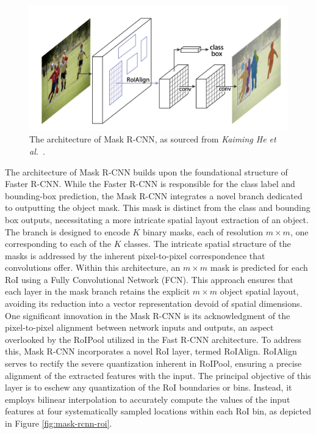 \begin{figure}[htb]
    \centering
    \includegraphics[width=0.7\linewidth]{figures/chapters-imgs/30/mask-rcnn-arq.png}
    \caption{The architecture of Mask R-CNN, as sourced from \textit{Kaiming He et al.}~\cite{DBLP:journals/corr/HeGDG17}.}
    \label{fig:mask-rcnn-arq}
\end{figure}

The architecture of Mask R-CNN builds upon the foundational structure of Faster R-CNN. While the Faster R-CNN is responsible for the class label and bounding-box prediction, the Mask R-CNN integrates a novel branch dedicated to outputting the object mask. This mask is distinct from the class and bounding box outputs, necessitating a more intricate spatial layout extraction of an object. The branch is designed to encode \(K\) binary masks, each of resolution \(m \times m\), one corresponding to each of the \(K\) classes. The intricate spatial structure of the masks is addressed by the inherent pixel-to-pixel correspondence that convolutions offer. Within this architecture, an \(m \times m\) mask is predicted for each RoI using a Fully Convolutional Network (FCN). This approach ensures that each layer in the mask branch retains the explicit \(m \times m\) object spatial layout, avoiding its reduction into a vector representation devoid of spatial dimensions.
One significant innovation in the Mask R-CNN is its acknowledgment of the pixel-to-pixel alignment between network inputs and outputs, an aspect overlooked by the RoIPool utilized in the Fast R-CNN architecture. To address this, Mask R-CNN incorporates a novel RoI layer, termed RoIAlign. RoIAlign serves to rectify the severe quantization inherent in RoIPool, ensuring a precise alignment of the extracted features with the input. The principal objective of this layer is to eschew any quantization of the RoI boundaries or bins. Instead, it employs bilinear interpolation to accurately compute the values of the input features at four systematically sampled locations within each RoI bin, as depicted in Figure \ref{fig:mask-rcnn-roi}.\\

